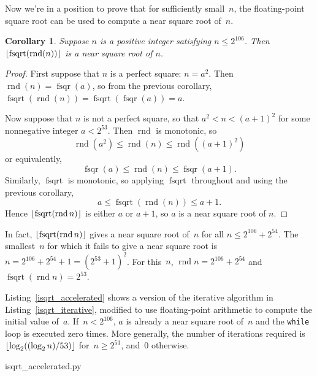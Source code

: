 \documentclass[a4paper]{article}
\DeclarePairedDelimiter\floor{\lfloor}{\rfloor}
\DeclareMathOperator{\rnd}{rnd}
\DeclareMathOperator{\fsqrt}{fsqrt}
\DeclareMathOperator{\fsqr}{fsqr}
\theoremstyle{plain}
\newtheorem{corollary}[theorem]{Corollary}
\theoremstyle{definition}
\begin{document}
Now we're in a position to prove that for sufficiently small~$n$, the
floating-point square root can be used to compute a near square root of~$n$.

\begin{corollary}
  Suppose $n$ is a positive integer satisfying $n \le 2^{106}$. Then
  $\floor{\fsqrt(\rnd(n))}$ is a near square root of $n$.
\end{corollary}

\begin{proof}
  First suppose that $n$ is a perfect square: $n = a^2$. Then $\rnd(n) =
  \fsqr(a)$, so from the previous corollary, $\fsqrt(\rnd(n)) =
  \fsqrt(\fsqr(a)) = a$.

  Now suppose that $n$ is not a perfect square, so that $a^2 < n < (a+1)^2$
  for some nonnegative integer $a < 2^{53}$. Then $\rnd$ is monotonic, so
    $$\rnd(a^2) \le \rnd(n) \le \rnd((a+1)^2)$$
  or equivalently,
    $$\fsqr(a) \le \rnd(n) \le \fsqr(a+1).$$
  Similarly, $\fsqrt$ is monotonic, so applying $\fsqrt$ throughout
  and using the previous corollary,
    $$a \le \fsqrt(\rnd(n)) \le a + 1.$$
  Hence $\floor{\fsqrt(\rnd n)}$ is either $a$ or $a+1$, so $a$ is a near
  square root of $n$.
\end{proof}

In fact, $\floor{\fsqrt(\rnd n)}$ gives a near square root of~$n$ for all $n
\le 2^{106} + 2^{54}$. The smallest~$n$ for which it fails to give a near
square root is $n = 2^{106} + 2^{54} + 1 = (2^{53} + 1)^2$. For this~$n$, $\rnd
n = 2^{106} + 2^{54}$ and $\fsqrt(\rnd n) = 2^{53}$.

Listing~\ref{isqrt_accelerated} shows a version of the iterative
algorithm in Listing~\ref{isqrt_iterative}, modified to use floating-point
arithmetic to compute the initial value of~$a$.  If~$n < 2^{106}$,
$a$ is already a near square root of~$n$ and the \lstinline$while$ loop is
executed zero times. More generally, the number of iterations required
is~$\floor{\log_2((\log_2n)/53)}$ for~$n \ge 2^{53}$, and~$0$ otherwise.



  {isqrt_accelerated.py}



\end{document}

